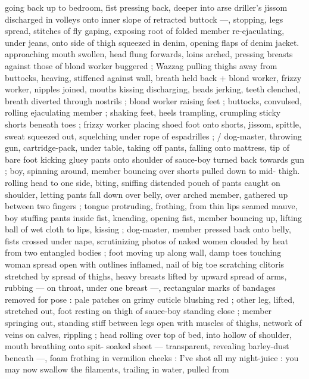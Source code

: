 going back up to bedroom, fist pressing back, deeper into arse 
driller's jissom discharged in volleys onto inner slope of retracted 
buttock ---, stopping, legs spread, stitches of fly gaping, exposing 
root of folded member re-ejaculating, under jeans, onto side of thigh 
squeezed in denim, opening flaps of denim jacket. approaching 
mouth swollen, head flung forwards, loins arched, pressing breasts 
against those of blond worker buggered ; Wazzag pulling thighs 
away from buttocks, heaving, stiffened against wall, breath held back 
+ blond worker, frizzy worker, nipples joined, mouths kissing 
discharging, heads jerking, teeth clenched, breath diverted through 
nostrils ; blond worker raising feet ; buttocks, convulsed, rolling 
ejaculating member ; shaking feet, heels trampling, crumpling sticky 
shorts beneath toes ; frizzy worker placing shoed foot onto shorts, 
jissom, spittle, sweat squeezed out, squelching under rope of 
espadrilles ; {\slash} dog-master, throwing gun, cartridge-pack, under table, 
taking off pants, falling onto mattress, tip of bare foot kicking gluey 
pants onto shoulder of sauce-boy turned back towards gun ; boy, 
spinning around, member bouncing over shorts pulled down to mid- 
thigh. rolling head to one side, biting, sniffing distended pouch of 
pants caught on shoulder, letting pants fall down over belly, over 
arched member, gathered up between two fingers ; tongue 
protruding, frothing, from thin lips seamed mauve, boy stuffing pants 
inside fist, kneading, opening fist, member bouncing up, lifting ball 
of wet cloth to lips, kissing ; dog-master, member pressed back onto 
belly, fists crossed under nape, scrutinizing photos of naked women 
clouded by heat from two entangled bodies ; foot moving up along 
wall, damp toes touching woman spread open with outlines inflamed, 
nail of big toe scratching clitoris stretched by spread of thighs, 
heavy breasts lifted by upward spread of arms, rubbing --- on throat, 
under one breast ---, rectangular marks of bandages removed for 
pose : pale patches on grimy cuticle blushing red ; other leg, lifted, 
stretched out, foot resting on thigh of sauce-boy standing close ; 
member springing out, standing stiff between legs open with 
muscles of thighs, network of veins on calves, rippling ; head rolling 
over top of bed, into hollow of shoulder, mouth breathing onto spit- 
soaked sheet --- transparent, revealing barley-dust beneath ---, 
foam frothing in vermilion cheeks : {\td} {\gl} {\thd} I've shot all my night-juice 
: you may now swallow the filaments, trailing in water, pulled from 

